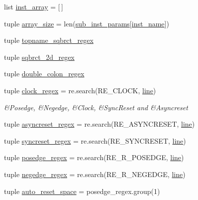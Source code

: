 \begin{DoxyCompactItemize}
list \hyperlink{namespaceveripy_a1be2f445d115897ce46823d58aff90c6}{inst\-\_\-array} = \mbox{[}$\,$\mbox{]}
\item 
tuple \hyperlink{namespaceveripy_a72b25fc3b125307dcf8fff0f983bea47}{array\-\_\-size} = len(\hyperlink{namespaceveripy_a3d4e4d7b77fb2b4b84c418a101755e7c}{sub\-\_\-inst\-\_\-params}\mbox{[}\hyperlink{namespaceveripy_a7d88d1a02b6ed2027a623447589c4fcd}{inst\-\_\-name}\mbox{]})
\item 
tuple \hyperlink{namespaceveripy_a6b7c63fe728396ebc9152876b49a06d0}{topname\-\_\-sqbrct\-\_\-regex}
\item 
tuple \hyperlink{namespaceveripy_a3b0f5f7cc0eeac48c1b8c8ca764faf0b}{sqbrct\-\_\-2d\-\_\-regex}
\item 
tuple \hyperlink{namespaceveripy_aef963574b2302ef9e877156896ba492c}{double\-\_\-colon\-\_\-regex}
\item 
tuple \hyperlink{namespaceveripy_a296a71c1d954e9620e163178151f0a5f}{clock\-\_\-regex} = re.\-search(R\-E\-\_\-\-C\-L\-O\-C\-K, \hyperlink{namespaceveripy_a3cf9cf94513841f0d65d3081b08a55cc}{line})
\begin{DoxyCompactList}\small\item\em \&Posedge, \&Negedge, \&Clock, \&Sync\-Reset and \&Asyncreset \end{DoxyCompactList}\item 
tuple \hyperlink{namespaceveripy_aabfe96ccfbd96d91208eb10df3fad611}{asyncreset\-\_\-regex} = re.\-search(R\-E\-\_\-\-A\-S\-Y\-N\-C\-R\-E\-S\-E\-T, \hyperlink{namespaceveripy_a3cf9cf94513841f0d65d3081b08a55cc}{line})
\item 
tuple \hyperlink{namespaceveripy_a69ba54ab5fdc8fc7d6575a37675bdb8d}{syncreset\-\_\-regex} = re.\-search(R\-E\-\_\-\-S\-Y\-N\-C\-R\-E\-S\-E\-T, \hyperlink{namespaceveripy_a3cf9cf94513841f0d65d3081b08a55cc}{line})
\item 
tuple \hyperlink{namespaceveripy_a539ac3ffa8c747bee3236b8735881ca3}{posedge\-\_\-regex} = re.\-search(R\-E\-\_\-\-R\-\_\-\-P\-O\-S\-E\-D\-G\-E, \hyperlink{namespaceveripy_a3cf9cf94513841f0d65d3081b08a55cc}{line})
\item 
tuple \hyperlink{namespaceveripy_a73d80450abbdcabc03a0ff6e4fbd5d48}{negedge\-\_\-regex} = re.\-search(R\-E\-\_\-\-R\-\_\-\-N\-E\-G\-E\-D\-G\-E, \hyperlink{namespaceveripy_a3cf9cf94513841f0d65d3081b08a55cc}{line})
\item 
tuple \hyperlink{namespaceveripy_a756720df8d8fb83c52d7838e312cbb53}{auto\-\_\-reset\-\_\-space} = posedge\-\_\-regex.\-group(1)
\item 

\end{DoxyCompactItemize}
